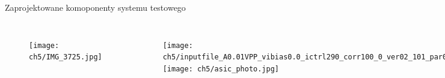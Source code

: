 \begin{frame}{Zaprojektowane komoponenty systemu testowego}



\begin{columns}
    \vspace{-1em}

    \begin{figure}[H]
    \centering
        \texttt{[image: ch5/IMG\_3725.jpg]}
    \end{figure}

\vspace{-1em}
    \begin{figure}[H]
    \centering
        \texttt{[image: ch5/inputfile\_A0.01VPP\_vibias0.0\_ictrl290\_corr100\_0\_ver02\_101\_par0\_test\_generator.png]} 
        \texttt{[image: ch5/asic\_photo.jpg]}

    \end{figure}
\end{columns}


\end{frame}


